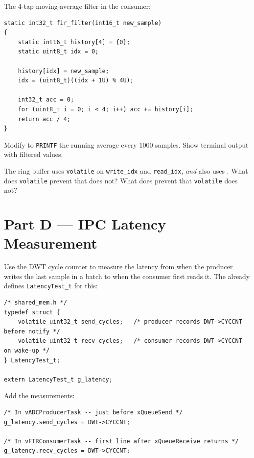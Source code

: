 \documentclass[11pt, a4paper]{article}
\begin{document}
The 4-tap moving-average filter in the consumer:

\begin{lstlisting}[style=cstyle]
static int32_t fir_filter(int16_t new_sample)
{
    static int16_t history[4] = {0};
    static uint8_t idx = 0;

    history[idx] = new_sample;
    idx = (uint8_t)((idx + 1U) % 4U);

    int32_t acc = 0;
    for (uint8_t i = 0; i < 4; i++) acc += history[i];
    return acc / 4;
}
\end{lstlisting}

\begin{checkpointbox}[~C]
  Modify  to \texttt{PRINTF} the running average every 1000
  samples. Show terminal output with filtered values.
\end{checkpointbox}

\begin{questionbox}[~C1]
  The ring buffer uses \texttt{volatile} on \texttt{write\_idx} and
  \texttt{read\_idx}, \emph{and} also uses . What does
  \texttt{volatile} prevent that  does not? What does
   prevent that \texttt{volatile} does not?
\end{questionbox}

\section{Part D --- IPC Latency Measurement}

Use the DWT cycle counter to measure the latency from when the producer writes the
last sample in a batch to when the consumer first reads it. The 
already defines \texttt{LatencyTest\_t} for this:

\begin{lstlisting}[style=cstyle]
/* shared_mem.h */
typedef struct {
    volatile uint32_t send_cycles;   /* producer records DWT->CYCCNT before notify */
    volatile uint32_t recv_cycles;   /* consumer records DWT->CYCCNT on wake-up */
} LatencyTest_t;

extern LatencyTest_t g_latency;
\end{lstlisting}

Add the measurements:

\begin{lstlisting}[style=cstyle]
/* In vADCProducerTask -- just before xQueueSend */
g_latency.send_cycles = DWT->CYCCNT;

/* In vFIRConsumerTask -- first line after xQueueReceive returns */
g_latency.recv_cycles = DWT->CYCCNT;
\end{lstlisting}
\end{document}

